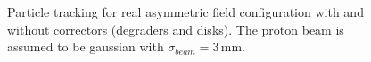 \begin{figure}[!h]
	\begin{center}
		
	\end{center}
	\caption[Particle tracking for real asymmetric field configuration with and without configuration]{Particle tracking for real asymmetric field configuration with and without correctors (degraders and disks). The proton beam is assumed to be gaussian with $\sigma_{beam}=3\,\mathrm{mm}$.}
	\label{chap3:AsymTransversalProfile}
\end{figure}
